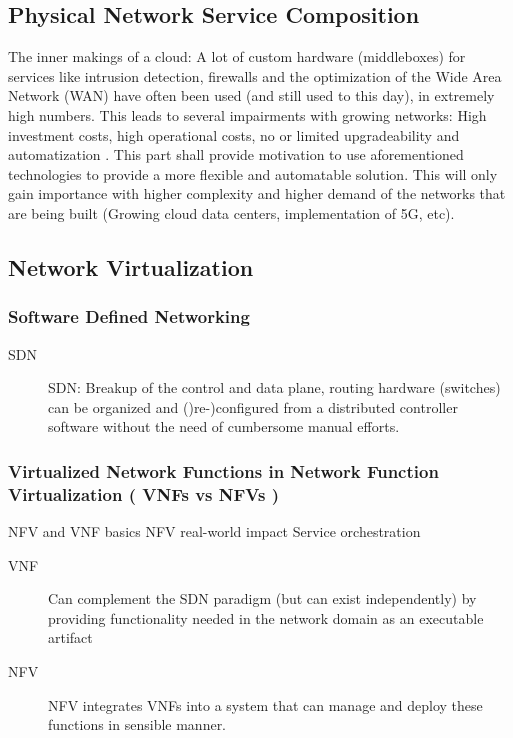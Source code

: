 \subsection{Physical Network Service Composition}
The inner makings of a cloud: A lot of custom hardware (middleboxes) for services like intrusion detection, firewalls and the optimization of the Wide Area Network (WAN) have often been used (and still used to this day), in extremely high numbers. This leads to several impairments with growing networks: High investment costs, high operational costs, no or limited upgradeability and automatization   \cite{sherry2016middleboxes}. This part shall provide motivation to use aforementioned technologies to provide a more flexible and automatable solution. This will only gain importance with higher complexity and higher demand of the networks that are being built (Growing cloud data centers, implementation of 5G, etc). 

\subsection{Network Virtualization}
\subsubsection{Software Defined Networking}
\begin{description}
	\item [SDN] SDN: Breakup of the control and data plane, routing hardware (switches) can be organized and ()re-)configured from a distributed controller software without the need of cumbersome manual efforts.
\end{description}

\subsubsection{Virtualized Network Functions in Network Function Virtualization ( VNFs vs NFVs )}
NFV and VNF basics \cite{mijumbi2016network} NFV real-world impact \cite{bilal2016impact} Service orchestration \cite{de2018network}

\begin{description}
	\item [VNF] Can complement the SDN paradigm (but can exist independently)  by providing functionality needed in the network domain as an executable artifact
	\item [NFV] NFV integrates VNFs into a system that can manage and deploy these functions in sensible manner. 
\end{description}
